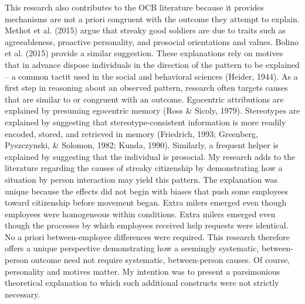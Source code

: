 \documentclass[english,,man]{apa6}
\begin{document}
This research also contributes to the OCB literature because it provides mechanisms are not a priori congruent with the outcome they attempt to explain. Methot et al. (2015) argue that streaky good soldiers are due to traits such as agreeableness, proactive personality, and prosocial orientations and values. Bolino et al. (2015) provide a similar suggestion. These explanations rely on motives that in advance dispose individuals in the direction of the pattern to be explained -- a common tactit used in the social and behavioral sciences (Heider, 1944). As a first step in reasoning about an observed pattern, research often targets causes that are similar to or congruent with an outcome. Egocentric attributions are explained by presuming egocentric memory (Ross \& Sicoly, 1979). Stereotypes are explained by suggesting that stereotype-consistent information is more readily encoded, stored, and retrieved in memory (Friedrich, 1993; Greenberg, Pyszczynski, \& Solomon, 1982; Kunda, 1990). Similarly, a frequent helper is explained by suggesting that the individual is prosocial. My research adds to the literature regarding the causes of streaky citizenship by demonstrating how a situation by person interaction may yield this pattern. The explanation was unique because the effects did not begin with biases that push some employees toward citizenship before movement began. Extra milers emerged even though employees were homogeneous within conditions. Extra milers emerged even though the processes by which employees received help requests were identical. No a priori between-employee differences were required. This research therefore offers a unique perspective demonstrating how a seemingly systematic, between-person outcome need not require systematic, between-person causes. Of course, personality and motives matter. My intention was to present a parsimonious theoretical explanation to which such additional constructs were not strictly necessary.
\end{document}
